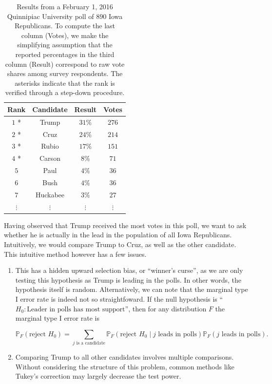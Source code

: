 \documentclass[11pt]{article}
\newcommand{\PP}{\mathbb{P}}
\begin{document}
\begin{table}[htbp]
\begin{center}
\begin{tabular}{c c c c}
	\hline
	Rank & Candidate & Result & Votes \\
	\hline
	$1$ * & Trump & $31\%$ & $276$ \\
	$2$ * & Cruz & $24\%$ & $214$ \\
	$3$ * & Rubio & $17\%$ & $151$ \\
	$4$ * & Carson & $8\%$ & $71$ \\
	$5$ & Paul & $4\%$ & $36$ \\
	$6$ & Bush & $4\%$ & $36$ \\
	$7$ & Huckabee & $3\%$ & $27$ \\
	$\vdots$ & $\vdots$ & $\vdots $ & $\vdots$ \\
	\hline
\end{tabular}
\end{center}
\caption{Results from a February 1, 2016 Quinnipiac University poll of $890$ Iowa Republicans. To compute the last column (Votes), we make the simplifying assumption that the reported percentages in the third column (Result) correspond to raw vote shares among survey respondents. The asterisks indicate that the rank is verified through a step-down procedure.}
\label{tbl:poll}
\end{table}

Having observed that Trump received the most votes in this poll, we want to ask whether he is actually in the lead in the population of all Iowa Republicans. Intuitively, we would compare Trump to Cruz, as well as the other candidate. This intuitive method however has a few issues.

\begin{enumerate}

\item This has a hidden upward selection bias, or ``winner's curse'', as we are only testing this hypothesis as Trump is leading in the polls. In other words, the hypothesis itself is random. Alternatively, we can note that the marginal type I error rate is indeed not so straightfoward. If the null hypothesis is ``$H_0: \text{Leader in polls has most support}$'', then for any distribution $F$ the marginal type I error rate is

\begin{equation}
\PP_F\left(\text{reject } H_0\right) = \sum_{j \text{ is a candidate}} \PP_F\left(\text{reject } H_0 \middle| j \text{ leads in polls}\right) \PP_F \left(j \text{ leads in polls}\right).
\label{eqn:marginal_error}
\end{equation}

\item Comparing Trump to all other candidates involves multiple comparisons. Without considering the structure of this problem, common methods like Tukey's correction \cite{Tukey:1951} may largely decrease the test power.

\end{enumerate}
\end{document}
